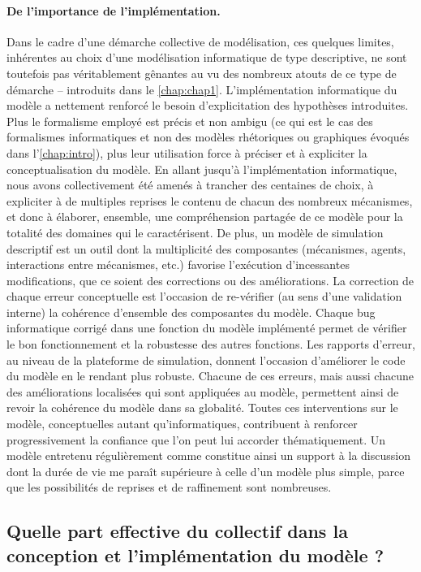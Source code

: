 \paragraph{De l'importance de l'implémentation.}
Dans le cadre d'une démarche collective de modélisation, ces quelques limites, inhérentes au choix d'une modélisation informatique de type descriptive, ne sont toutefois pas véritablement gênantes au vu des nombreux atouts de ce type de démarche -- introduits dans le \cref{chap:chap1}.
L'implémentation informatique du modèle a nettement renforcé le besoin d'explicitation des hypothèses introduites.
Plus le formalisme employé est précis et non ambigu (ce qui est le cas des formalismes informatiques et non des modèles \og rhétoriques\fg{} ou \og graphiques\fg{} évoqués dans l'\cref{chap:intro}), plus leur utilisation force à préciser et à expliciter la conceptualisation du modèle.
En allant jusqu'à l'implémentation informatique, nous avons collectivement été amenés à trancher des centaines de choix, à expliciter à de multiples reprises le contenu de chacun des nombreux mécanismes, et donc à élaborer, ensemble, une compréhension partagée de ce modèle pour la totalité des domaines qui le caractérisent.
De plus, un modèle de simulation descriptif est un outil dont la multiplicité des composantes (mécanismes, agents, interactions entre mécanismes, etc.) favorise l'exécution d'incessantes modifications, que ce soient des corrections ou des améliorations.
La correction de chaque erreur conceptuelle est l'occasion de re-vérifier (au sens d'une validation interne) la cohérence d'ensemble des composantes du modèle.
Chaque bug informatique corrigé dans une fonction du modèle implémenté permet de vérifier le bon fonctionnement et la robustesse des autres fonctions.
Les rapports d'erreur, au niveau de la plateforme de simulation, donnent l'occasion d'améliorer le code du modèle en le rendant plus robuste.
Chacune de ces erreurs, mais aussi chacune des améliorations localisées qui sont appliquées au modèle, permettent ainsi de revoir la cohérence du modèle dans sa globalité.
Toutes ces interventions sur le modèle, conceptuelles autant qu'informatiques, contribuent à renforcer progressivement la confiance que l'on peut lui accorder thématiquement. Un modèle \og entretenu régulièrement\fg{} comme \simfeodal{} constitue ainsi un support à la discussion dont la \og durée de vie\fg{} me paraît supérieure à celle d'un modèle plus simple, parce que les possibilités de reprises et de raffinement sont nombreuses.

\subsection{Quelle part effective du collectif dans la conception et l'implémentation du modèle ?}

